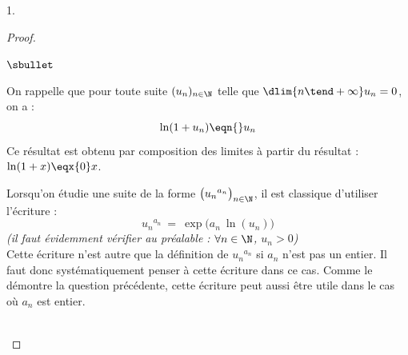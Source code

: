 \begin{noliste}{1.}
\begin{proof}
    \begin{remark}
      \begin{noliste}{$\sbullet$}
      \item On rappelle que pour toute suite $(u_n)_{n \in \N}$ telle
        que $\dlim{n \tend +\infty} u_n = 0$, on a : 
        \[
        \ln(1+u_n) \eqn{} u_n
        \]
        Ce résultat est obtenu par composition des limites à partir du
        résultat : $\ln(1+x) \eqx{0} x$.
      \item Lorsqu'on étudie une suite de la forme $\big( u_n{}^{a_n}
        \big)_{n \in \N}$, il est classique d'utiliser l'écriture :
        \[
        u_n{}^{a_n} \ = \ \exp\big( a_n \ \ln(u_n) \big)
        \]
        {\it (il faut évidemment vérifier au préalable : $\forall n
          \in \N$, $u_n > 0$)}\\[.1cm]
        Cette écriture n'est autre que la définition de $u_n{}^{a_n}$
        si $a_n$ n'est pas un entier. Il faut donc systématiquement
        penser à cette écriture dans ce cas. Comme le démontre la
        question précédente, cette écriture peut aussi être utile dans
        le cas où $a_n$ est entier.
      \end{noliste}
    \end{remark}~\\[-1.4cm]
  \end{proof}
\end{noliste}

